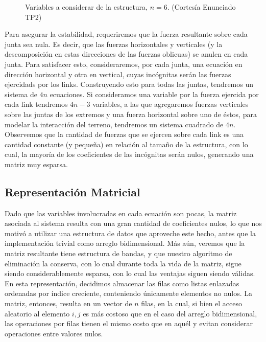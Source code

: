 \begin{figure}[!ht]
\begin{center}

\caption{Variables a considerar de la estructura, $n = 6$. \small{(Cortesía Enunciado TP2)}}
\label{fig:estructuras}
\end{center}
\end{figure}


Para asegurar la estabilidad, requeriremos que la fuerza resultante sobre cada junta sea nula. Es decir, que las fuerzas horizontales y verticales (y la descomposición en estas direcciones de las fuerzas oblicuas) se anulen en cada junta. Para satisfacer esto, consideraremos, por cada junta, una ecuación en dirección horizontal y otra en vertical, cuyas incógnitas serán las fuerzas ejercidads por los links. Construyendo esto para todas las juntas, tendremos un sistema de $4n$ ecuaciones. Si consideramos una variable por la fuerza ejercida por cada link tendremos $4n-3$ variables, a las que agregaremos fuerzas verticales sobre las juntas de los extremos y una fuerza horizontal sobre uno de éstos, para modelar la interacción del terreno, tendremos un sistema cuadrado de $4n$. Observemos que la cantidad de fuerzas que se ejercen sobre cada link es una cantidad constante (y pequeña) en relación al tamaño de la estructura, con lo cual, la mayoría de los coeficientes de las incógnitas serán nulos, generando una 
matriz muy esparsa.

\subsection{Representación Matricial}
Dado que las variables involucradas en cada ecuación son pocas, la matriz asociada al sistema resulta con una gran cantidad de coeficientes nulos, lo que nos motivó a utilizar una estructura de datos que aproveche este hecho, antes que la implementación trivial como arreglo bidimensional. Más aún, veremos que la matriz resultante tiene estructura de bandas, y que nuestro algoritmo de eliminación la conserva, con lo cual durante toda la vida de la matriz, sigue siendo considerablemente esparsa, con lo cual las ventajas siguen siendo válidas. En esta representación, decidimos almacenar las filas como listas enlazadas ordenadas por índice creciente, conteniendo únicamente elementos no nulos. La matriz, entonces, resulta en un vector de $n$ filas, en la cual, si bien el acceso aleatorio al elemento $i,j$ es más costoso que en el caso del arreglo bidimensional, las operaciones por filas tienen el mismo costo que en aquél y evitan considerar operaciones entre valores nulos.

